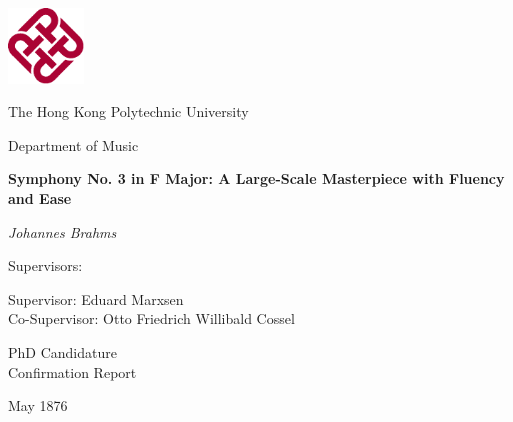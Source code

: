 \thispagestyle{empty}

\vspace*{1cm}

\begin{center}
\includegraphics[height=2cm]{Polyu logo.pdf}
\end{center}

\begin{center}

\vspace{1cm}
{\Large The Hong Kong Polytechnic University}

\vspace{0.5cm}
{\large Department of Music}

\vspace{2cm}
{\Large \textbf{
Symphony No. 3 in F Major: A Large-Scale Masterpiece with Fluency and Ease
}}

\vspace{2cm}
{\large \textit{Johannes Brahms}}

\vspace{2cm}
{\large Supervisors:}

\vspace{0.5cm}
{\large Supervisor: Eduard Marxsen} \\
{\large Co-Supervisor: Otto Friedrich Willibald Cossel}

\vspace{2cm}
{\large PhD Candidature \\ Confirmation Report}

\vspace{0.5cm}
{\large May 1876}

\end{center}
